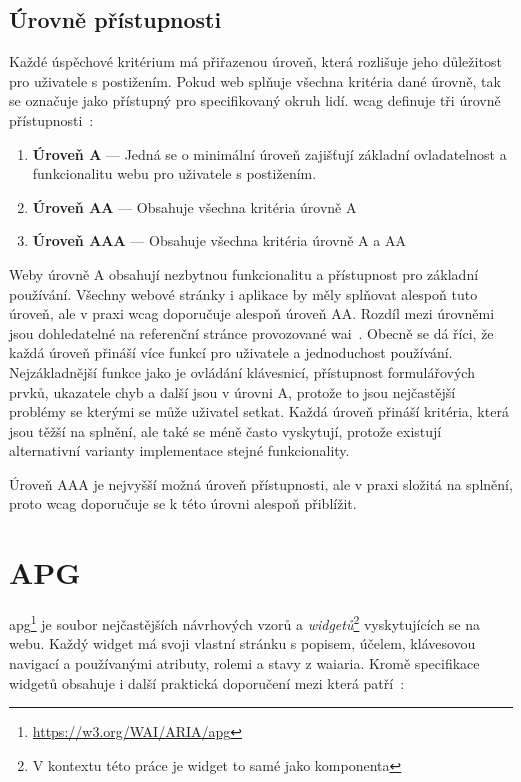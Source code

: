 \subsection{Úrovně přístupnosti}

Každé úspěchové kritérium má přiřazenou úroveň, která rozlišuje jeho důležitost pro uživatele s postižením.
Pokud web splňuje všechna kritéria dané úrovně, tak se označuje jako přístupný pro specifikovaný okruh lidí.
\gls{wcag} definuje tři úrovně přístupnosti~\cite[Sekce 5.2.1]{wcag}:

\begin{enumerate}
    \item \textbf{Úroveň A} --- Jedná se o minimální úroveň zajišťují základní ovladatelnost a funkcionalitu webu pro uživatele s postižením.
    \item \textbf{Úroveň AA} --- Obsahuje všechna kritéria úrovně A
    \item \textbf{Úroveň AAA} --- Obsahuje všechna kritéria úrovně A a AA
\end{enumerate}

Weby úrovně A obsahují nezbytnou funkcionalitu a přístupnost pro základní používání.
Všechny webové stránky i aplikace by měly splňovat alespoň tuto úroveň, ale v praxi \gls{wcag} doporučuje alespoň úroveň AA.
Rozdíl mezi úrovněmi jsou dohledatelné na referenční stránce provozované \gls{wai}~\cite{wcag-reference}.
Obecně se dá říci, že každá úroveň přináší více funkcí pro uživatele a jednoduchost používání.
Nejzákladnější funkce jako je ovládání klávesnicí, přístupnost formulářových prvků, ukazatele chyb a další jsou v úrovni A, protože to jsou nejčastější problémy se kterými se může uživatel setkat.
Každá úroveň přináší kritéria, která jsou těžší na splnění, ale také se méně často vyskytují, protože existují alternativní varianty implementace stejné funkcionality.

Úroveň AAA je nejvyšší možná úroveň přístupnosti, ale v praxi složitá na splnění, proto \gls{wcag} doporučuje se k této úrovni alespoň přiblížit.

\section{APG}

\gls{apg}\footnote{\url{https://w3.org/WAI/ARIA/apg}} je soubor nejčastějších návrhových vzorů a \textit{widgetů}\footnote{V kontextu této práce je widget to samé jako komponenta} vyskytujících se na webu.
Každý widget má svoji vlastní stránku s popisem, účelem, klávesovou navigací a používanými atributy, rolemi a stavy z \gls{waiaria}.
Kromě specifikace widgetů obsahuje i další praktická doporučení mezi která patří~\cite{apg}:

